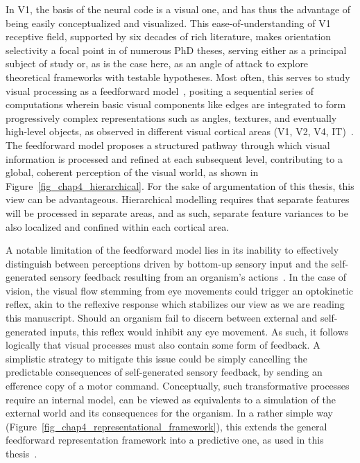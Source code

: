 In \gls{V1}, the basis of the neural code is a visual one, and has thus the advantage of being easily conceptualized and visualized. This ease-of-understanding of \gls{V1} receptive field, supported by six decades of rich literature, makes orientation selectivity a focal point in of numerous PhD theses, serving either as a principal subject of study or, as is the case here, as an angle of attack to explore theoretical frameworks with testable hypotheses. Most often, this serves to study visual processing as a feedforward model~\cite{kreiman2020beyond}, positing a sequential series of computations wherein basic visual components like edges are integrated to form progressively complex representations such as angles, textures, and eventually high-level objects, as observed in different visual cortical areas (V1, V2, V4, IT)~\cite{lamme1998feedforward}. The feedforward model proposes a structured pathway through which visual information is processed and refined at each subsequent level, contributing to a global, coherent perception of the visual world, as shown in Figure~\ref{fig_chap4_hierarchical}. For the sake of argumentation of this thesis, this view can be advantageous. Hierarchical modelling requires that separate features will be processed in separate areas, and as such, separate feature variances to be also localized and confined within each cortical area.

A notable limitation of the feedforward model lies in its inability to effectively distinguish between perceptions driven by bottom-up sensory input and the self-generated sensory feedback resulting from an organism's actions~\cite{von1950reafferenzprinzip,keller2018predictive}. In the case of vision, the visual flow stemming from eye movements could trigger an optokinetic reflex, akin to the reflexive response which stabilizes our view as we are reading this manuscript. Should an organism fail to discern between external and self-generated inputs, this reflex would inhibit any eye movement. As such, it follows logically that visual processes must also contain some form of feedback.
A simplistic strategy to mitigate this issue could be simply cancelling the predictable consequences of self-generated sensory feedback, by sending an efference copy of a motor command. 
Conceptually, such transformative processes require an internal model, can be viewed as equivalents to a simulation of the external world and its consequences for the organism. In a rather simple way (Figure~\ref{fig_chap4_representational_framework}), this extends the general feedforward representation framework into a predictive one, as used in this thesis~\cite{friston2016active}.

